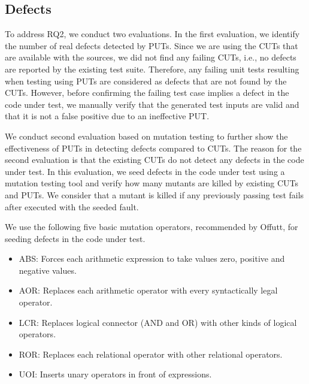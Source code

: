 \subsection{Defects}

To address RQ2, we conduct two evaluations. In the first evaluation, we identify the number of real defects detected by PUTs. Since we are using the CUTs that are available with the sources, we did not find any failing CUTs, i.e., no defects are reported by the existing test suite. Therefore, any failing unit tests resulting when testing using PUTs are considered as defects that are not found by the CUTs. However, before confirming the failing test case implies a defect in the code under test, we manually verify that the generated test inputs are valid and that it is not a false positive due to an ineffective PUT. 

We conduct second evaluation based on mutation testing to further show the effectiveness of PUTs in detecting defects compared to CUTs. The reason for the second evaluation is that the existing CUTs do not detect any defects in the code under test. In this evaluation, we seed defects in the code under test using a mutation testing tool and verify
how many mutants are killed by existing CUTs and PUTs. We consider that a mutant is killed if any previously passing test fails after executed with the seeded fault. 

We use the following five basic mutation operators, recommended by Offutt, for seeding defects in the code under test.

\begin{itemize}
\item ABS: Forces each arithmetic expression to take values zero, positive and negative values.
\item AOR: Replaces each arithmetic operator with every syntactically legal operator.
\item LCR: Replaces logical connector (AND and OR) with other kinds of logical operators.
\item ROR: Replaces each relational operator with other relational operators.
\item UOI: Inserts unary operators in front of expressions.
\end{itemize}